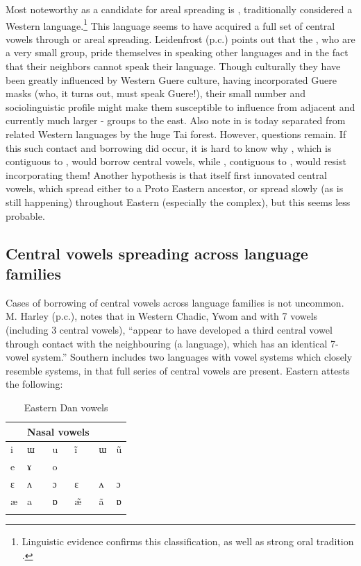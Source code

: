\documentclass[output=paper,newtxmath,modfonts,nonflat,draft]{langsci/langscibook}
\begin{document}
Most noteworthy as a candidate for areal spreading is , traditionally considered a Western  language.\footnote{Linguistic evidence confirms this classification, as well as strong oral tradition \citep{centredetraduction2013}.} This language seems to have acquired a full set of central vowels through  or areal spreading.  Leidenfrost (p.c.) points out that the , who are a very small group, pride themselves in speaking other languages and in the fact that their neighbors cannot speak their language.  Though culturally they have been greatly influenced by Western Guere culture, having incorporated Guere masks (who, it turns out, must speak Guere!), their small number and sociolinguistic profile might make them susceptible to influence from adjacent and currently much larger -  groups to the east. Also note in   is today separated from related Western languages by the huge Tai forest. However, questions remain. If this such contact and borrowing did occur, it is hard to know why , which is contiguous to , would borrow central vowels, while , contiguous to , would resist incorporating them! Another hypothesis is that  itself first innovated central vowels, which spread either to a Proto Eastern  ancestor, or spread slowly (as is still happening) throughout Eastern  (especially the  complex), but this seems less probable.   

\subsection{Central vowels spreading across language families}\label{sec:zogbo:5.2} 

Cases of borrowing of central vowels across language families is not uncommon. M. Harley (p.c.), notes that in Western Chadic, Ywom and  with 7 vowels (including 3 central vowels), “appear to have developed a third central vowel through contact with the neighbouring  (a  language), which has an identical 7-vowel system.”  Southern  includes two  languages with vowel systems which closely resemble  systems, in that full series of central vowels are present. Eastern  attests the following: 

\begin{table}
\caption{Eastern Dan vowels \citep{Vydrine2009}}
\label{tab:zogbo:24}
\begin{tabular}{llp{2cm}lll}
\lsptoprule
\multicolumn{3}{l}{Oral vowels} &     \multicolumn{3}{l}{Nasal vowels}\\
\midrule
i & ɯ & u  &  ĩ & ɯ & ũ\\

e & ɤ & o\\

ɛ & ʌ & ɔ  &  ɛ & ʌ & ɔ\\

æ & a & ɒ  &  \~{æ} & ã & ɒ\\
\lspbottomrule
\end{tabular}
\end{table}
\end{document}
